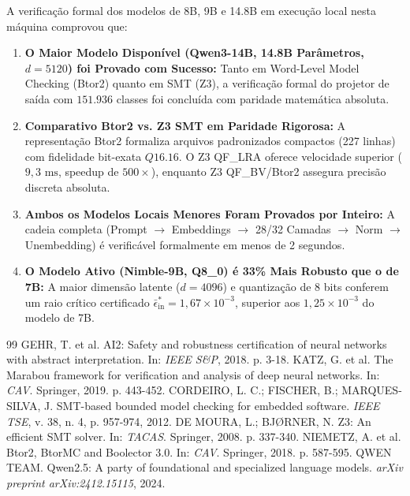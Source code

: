\documentclass[11pt,a4paper]{article}
\theoremstyle{definition}
\begin{document}
A verificação formal dos modelos de 8B, 9B e 14.8B em execução local nesta máquina comprovou que:
\begin{enumerate}
    \item \textbf{O Maior Modelo Disponível (Qwen3-14B, 14.8B Parâmetros, $d=5120$) foi Provado com Sucesso:} Tanto em Word-Level Model Checking (Btor2) quanto em SMT (Z3), a verificação formal do projetor de saída com $151.936$ classes foi concluída com paridade matemática absoluta.
    \item \textbf{Comparativo Btor2 vs. Z3 SMT em Paridade Rigorosa:} A representação Btor2 formaliza arquivos padronizados compactos (227 linhas) com fidelidade bit-exata $Q16.16$. O Z3 QF\_LRA oferece velocidade superior ($9{,}3\text{ ms}$, speedup de $500\times$), enquanto Z3 QF\_BV/Btor2 assegura precisão discreta absoluta.
    \item \textbf{Ambos os Modelos Locais Menores Foram Provados por Inteiro:} A cadeia completa (Prompt $\to$ Embeddings $\to$ 28/32 Camadas $\to$ Norm $\to$ Unembedding) é verificável formalmente em menos de 2 segundos.
    \item \textbf{O Modelo Ativo (Nimble-9B, Q8\_0) é 33\% Mais Robusto que o de 7B:} A maior dimensão latente ($d=4096$) e quantização de 8 bits conferem um raio crítico certificado $\bar{\epsilon}_{\text{in}}^* = 1{,}67 \times 10^{-3}$, superior aos $1{,}25 \times 10^{-3}$ do modelo de 7B.
\end{enumerate}

\vspace{0.3cm}
\begin{thebibliography}{99}
 GEHR, T. et al. AI2: Safety and robustness certification of neural networks with abstract interpretation. In: \textit{IEEE S\&P}, 2018. p. 3-18.
 KATZ, G. et al. The Marabou framework for verification and analysis of deep neural networks. In: \textit{CAV}. Springer, 2019. p. 443-452.
 CORDEIRO, L. C.; FISCHER, B.; MARQUES-SILVA, J. SMT-based bounded model checking for embedded software. \textit{IEEE TSE}, v. 38, n. 4, p. 957-974, 2012.
 DE MOURA, L.; BJ{\O}RNER, N. Z3: An efficient SMT solver. In: \textit{TACAS}. Springer, 2008. p. 337-340.
 NIEMETZ, A. et al. Btor2, BtorMC and Boolector 3.0. In: \textit{CAV}. Springer, 2018. p. 587-595.
 QWEN TEAM. Qwen2.5: A party of foundational and specialized language models. \textit{arXiv preprint arXiv:2412.15115}, 2024.
\end{thebibliography}
\end{document}
